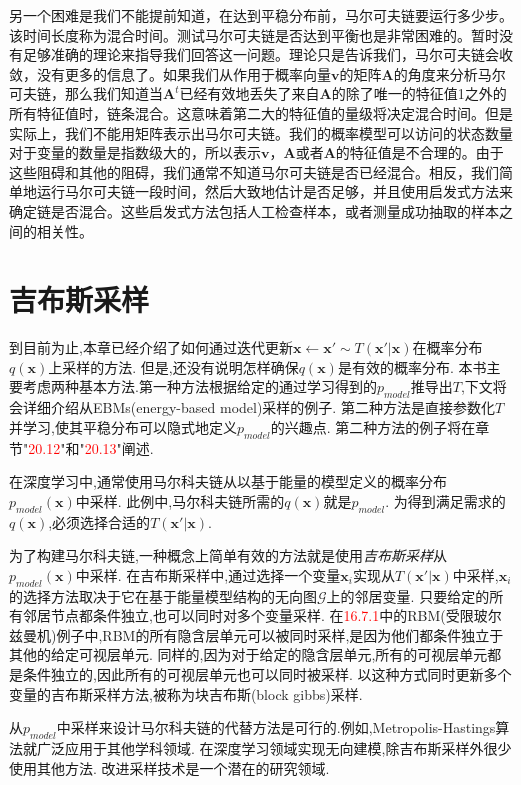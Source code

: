 另一个困难是我们不能提前知道，在达到平稳分布前，马尔可夫链要运行多少步。该时间长度称为混合时间。测试马尔可夫链是否达到平衡也是非常困难的。暂时没有足够准确的理论来指导我们回答这一问题。理论只是告诉我们，马尔可夫链会收敛，没有更多的信息了。如果我们从作用于概率向量\(\bm{v}\)的矩阵\(\bm{A}\)的角度来分析马尔可夫链，那么我们知道当\({ \bm{A} }^{ t }\)已经有效地丢失了来自\(\bm{A}\)的除了唯一的特征值1之外的所有特征值时，链条混合。这意味着第二大的特征值的量级将决定混合时间。但是实际上，我们不能用矩阵表示出马尔可夫链。我们的概率模型可以访问的状态数量对于变量的数量是指数级大的，所以表示\(\bm{v}\)，\(\bm{A}\)或者\(\bm{A}\)的特征值是不合理的。由于这些阻碍和其他的阻碍，我们通常不知道马尔可夫链是否已经混合。相反，我们简单地运行马尔可夫链一段时间，然后大致地估计是否足够，并且使用启发式方法来确定链是否混合。这些启发式方法包括人工检查样本，或者测量成功抽取的样本之间的相关性。


\section{吉布斯采样}
\label{sec:17.4}

到目前为止,本章已经介绍了如何通过迭代更新$\bm{x}\leftarrow \bm{x}' \sim T (\bm{x}'|\bm{x}) $在概率分布$q(\bm{x})$上采样的方法.
但是,还没有说明怎样确保$q(\bm{x})$是有效的概率分布.
本书主要考虑两种基本方法.第一种方法根据给定的通过学习得到的$p_{model}$推导出$T$,下文将会详细介绍从EBMs(energy-based model)采样的例子.
第二种方法是直接参数化$T$并学习,使其平稳分布可以隐式地定义$p_{model}$的兴趣点.
第二种方法的例子将在章节"\textcolor{red}{20.12}"和"\textcolor{red}{20.13}"阐述.

在深度学习中,通常使用马尔科夫链从以基于能量的模型定义的概率分布$p_{model}(\bm{x})$中采样.
此例中,马尔科夫链所需的$q(\bm{x})$就是$p_{model}$.
为得到满足需求的$q(\bm{x})$,必须选择合适的$T(\bm{x}'|\bm{x})$.

为了构建马尔科夫链,一种概念上简单有效的方法就是使用\textit{吉布斯采样}从$p_{model}(\bm{x})$中采样.
在吉布斯采样中,通过选择一个变量$\textbf{x}_i$实现从$T(\textbf{x}'|\textbf{x})$中采样,$\textbf{x}_i$的选择方法取决于它在基于能量模型结构的无向图$\mathcal{G}$上的邻居变量.
只要给定的所有邻居节点都条件独立,也可以同时对多个变量采样.
在\textcolor{red}{16.7.1}中的RBM(受限玻尔兹曼机)例子中,RBM的所有隐含层单元可以被同时采样,是因为他们都条件独立于其他的给定可视层单元.
同样的,因为对于给定的隐含层单元,所有的可视层单元都是条件独立的,因此所有的可视层单元也可以同时被采样.
以这种方式同时更新多个变量的吉布斯采样方法,被称为块吉布斯(block gibbs)采样.

从$p_{model}$中采样来设计马尔科夫链的代替方法是可行的.例如,Metropolis-Hastings算法就广泛应用于其他学科领域.
在深度学习领域实现无向建模,除吉布斯采样外很少使用其他方法.
改进采样技术是一个潜在的研究领域.

